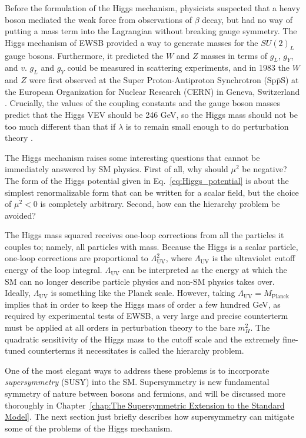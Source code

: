 \documentclass[dissertation.tex]{subfiles}
\begin{document}
Before the formulation of the Higgs mechanism, physicists suspected that a heavy boson mediated the weak force from observations of $\beta$ decay, but had no way of putting a mass term into the Lagrangian without breaking gauge symmetry.  The Higgs mechanism of EWSB provided a way to generate masses for the $SU(2)_{L}$ gauge bosons.  Furthermore, it predicted the $W$ and $Z$ masses in terms of $g_{L}$, $g_{Y}$, and $v$.  $g_{L}$ and $g_{Y}$ could be measured in scattering experiments, and in 1983 the $W$ and $Z$ were first observed at the Super Proton-Antiproton Synchrotron (Sp$\bar{\mbox{p}}$S) at the European Organization for Nuclear Research (CERN) in Geneva, Switzerland \cite{UA1_W, UA1_Z}.  Crucially, the values of the coupling constants and the gauge boson masses predict that the Higgs VEV should be 246 GeV, so the Higgs mass should not be too much different than that if $\lambda$ is to remain small enough to do perturbation theory \cite{Gunion}.

The Higgs mechanism raises some interesting questions that cannot be immediately answered by SM physics.  First of all, why should $\mu^{2}$ be negative?  The form of the Higgs potential given in Eq.~\ref{eq:Higgs_potential} is about the simplest renormalizable form that can be written for a scalar field, but the choice of $\mu^{2} < 0$ is completely arbitrary.  Second, how can the hierarchy problem be avoided?

The Higgs mass squared receives one-loop corrections from all the particles it couples to; namely, all particles with mass.  Because the Higgs is a scalar particle, one-loop corrections are proportional to $\Lambda_{\mathrm{UV}}^{2}$, where $\Lambda_{\mathrm{UV}}$ is the ultraviolet cutoff energy of the loop integral.  $\Lambda_{\mathrm{UV}}$ can be interpreted as the energy at which the SM can no longer describe particle physics and non-SM physics takes over.  Ideally, $\Lambda_{\mathrm{UV}}$ is something like the Planck scale.  However, taking $\Lambda_{\mathrm{UV}} = M_{\mathrm{Planck}}$ implies that in order to keep the Higgs mass of order a few hundred GeV, as required by experimental tests of EWSB, a very large and precise counterterm must be applied at all orders in perturbation theory to the bare $m_{H}^{2}$.  The quadratic sensitivity of the Higgs mass to the cutoff scale and the extremely fine-tuned counterterms it necessitates is called the hierarchy problem.

One of the most elegant ways to address these problems is to incorporate \textit{supersymmetry} (SUSY) into the SM.  Supersymmetry is new fundamental symmetry of nature between bosons and fermions, and will be discussed more thoroughly in Chapter~\ref{chap:The Supersymmetric Extension to the Standard Model}.  The next section just briefly describes how supersymmetry can mitigate some of the problems of the Higgs mechanism.
\end{document}
